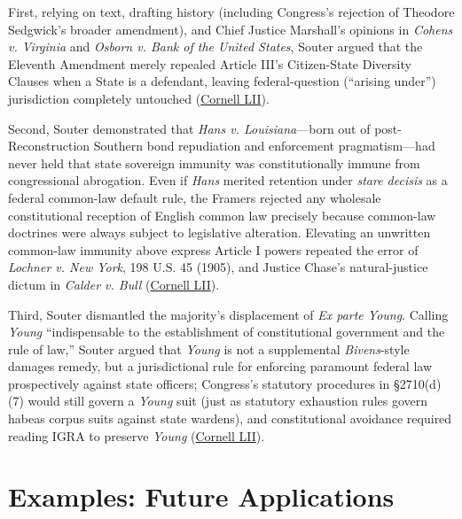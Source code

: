 \documentclass[12pt]{article}
\begin{document}
First, relying on text, drafting history (including Congress's rejection of Theodore Sedgwick's broader amendment), and Chief Justice Marshall's opinions in \textit{Cohens v. Virginia} and \textit{Osborn v. Bank of the United States}, Souter argued that the Eleventh Amendment merely repealed Article III's Citizen-State Diversity Clauses when a State is a defendant, leaving federal-question (``arising under'') jurisdiction completely untouched (\href{https://www.law.cornell.edu/supct/html/94-12.ZD1.html}{Cornell LII}).

Second, Souter demonstrated that \textit{Hans v. Louisiana}---born out of post-Reconstruction Southern bond repudiation and enforcement pragmatism---had never held that state sovereign immunity was constitutionally immune from congressional abrogation. Even if \textit{Hans} merited retention under \textit{stare decisis} as a federal common-law default rule, the Framers rejected any wholesale constitutional reception of English common law precisely because common-law doctrines were always subject to legislative alteration. Elevating an unwritten common-law immunity above express Article I powers repeated the error of \textit{Lochner v. New York}, 198 U.S. 45 (1905), and Justice Chase's natural-justice dictum in \textit{Calder v. Bull} (\href{https://www.law.cornell.edu/supct/html/94-12.ZD1.html}{Cornell LII}).

Third, Souter dismantled the majority's displacement of \textit{Ex parte Young}. Calling \textit{Young} ``indispensable to the establishment of constitutional government and the rule of law,'' Souter argued that \textit{Young} is not a supplemental \textit{Bivens}-style damages remedy, but a jurisdictional rule for enforcing paramount federal law prospectively against state officers; Congress's statutory procedures in \S 2710(d)(7) would still govern a \textit{Young} suit (just as statutory exhaustion rules govern habeas corpus suits against state wardens), and constitutional avoidance required reading IGRA to preserve \textit{Young} (\href{https://www.law.cornell.edu/supct/html/94-12.ZD1.html}{Cornell LII}).

\section{Examples: Future Applications}
\end{document}
